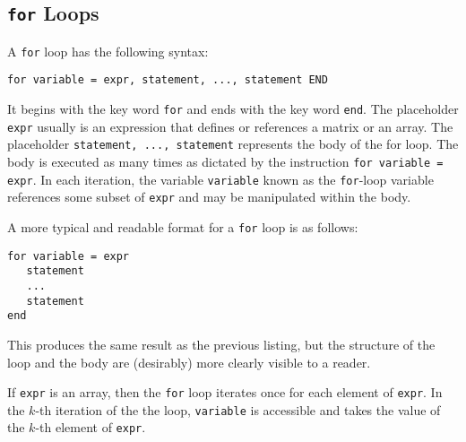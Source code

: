 \subsection{\texttt{for} Loops}

A \texttt{for} loop has the following syntax:
\begin{lstlisting}[style=Matlab-editor]
for variable = expr, statement, ..., statement END
\end{lstlisting}
It begins with the key word \texttt{for} and ends with the key word \texttt{end}. The placeholder \texttt{expr} usually is an expression that defines or references a matrix or an array. The placeholder \texttt{statement, ..., statement} represents the body of the for loop. The body is executed as many times as dictated by the instruction \texttt{for variable = expr}. In each iteration, the variable \texttt{variable} \textemdash known as the \texttt{for}-loop variable \textemdash references some subset of \texttt{expr} and may be manipulated within the body.

A more typical and readable format for a \texttt{for} loop is as follows:
\begin{lstlisting}[style=Matlab-editor]
for variable = expr
   statement
   ...
   statement
end
\end{lstlisting}
This produces the same result as the previous listing, but the structure of the loop and the body are (desirably) more clearly visible to a reader.

If \verb!expr! is an array, then the \texttt{for} loop iterates once for each element of \verb!expr!. In the $k$-th iteration of the the loop, \verb!variable! is accessible and takes the value of the $k$-th element of \verb!expr!.

